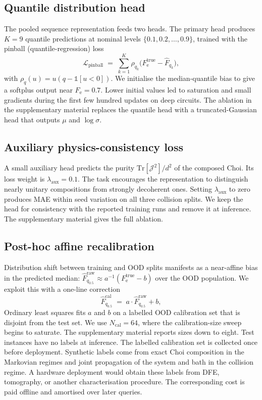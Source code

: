 \documentclass[12pt]{iopart}
\newcommand{\Fe}{F_{\mathrm{e}}}
\newcommand{\Fhat}{\widehat{F}}
\newcommand{\Choi}{\mathcal{J}}
\begin{document}
\subsection{Quantile distribution head}

The pooled sequence representation feeds two heads. The primary head produces $K = 9$ quantile predictions at nominal levels $\{0.1, 0.2, \ldots, 0.9\}$, trained with the pinball (quantile-regression) loss
\begin{equation}
\mathcal{L}_{\mathrm{pinball}} \;=\; \sum_{k=1}^{K} \rho_{q_k}\!\bigl( \Fe^{\mathrm{true}} - \Fhat_{q_k} \bigr),
\label{eq:pinball}
\end{equation}
with $\rho_{q}(u) = u(q - \mathbb{1}[u<0])$. We initialise the median-quantile bias to give a softplus output near $\Fe=0.7$. Lower initial values led to saturation and small gradients during the first few hundred updates on deep circuits. The ablation in the supplementary material replaces the quantile head with a truncated-Gaussian head that outputs $\mu$ and $\log\sigma$.

\subsection{Auxiliary physics-consistency loss}

A small auxiliary head predicts the purity $\mathrm{Tr}[\Choi^2]/d^{2}$ of the composed Choi. Its loss weight is $\lambda_{\mathrm{aux}}=0.1$. The task encourages the representation to distinguish nearly unitary compositions from strongly decoherent ones. Setting $\lambda_{\mathrm{aux}}$ to zero produces MAE within seed variation on all three collision splits. We keep the head for consistency with the reported training runs and remove it at inference. The supplementary material gives the full ablation.

\subsection{Post-hoc affine recalibration}
\label{sec:recal}

Distribution shift between training and OOD splits manifests as a near-affine bias in the predicted median: $\Fhat^{\mathrm{raw}}_{q_{0.5}} \approx a^{-1} (\Fe^{\mathrm{true}} - b)$ over the OOD population. We exploit this with a one-line correction
\begin{equation}
\Fhat^{\mathrm{cal}}_{q_{0.5}} \;=\; a \cdot \Fhat^{\mathrm{raw}}_{q_{0.5}} + b,
\label{eq:recal}
\end{equation}
Ordinary least squares fits $a$ and $b$ on a labelled OOD calibration set that is disjoint from the test set. We use $N_{\mathrm{cal}}=64$, where the calibration-size sweep begins to saturate. The supplementary material reports sizes down to eight. Test instances have no labels at inference. The labelled calibration set is collected once before deployment. Synthetic labels come from exact Choi composition in the Markovian regimes and joint propagation of the system and bath in the collision regime. A hardware deployment would obtain these labels from DFE, tomography, or another characterisation procedure. The corresponding cost is paid offline and amortised over later queries.
\end{document}
